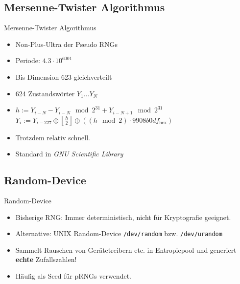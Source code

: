 \documentclass{beamer}
\begin{document}
\subsection{Mersenne-Twister Algorithmus}
\begin{frame}{Mersenne-Twister Algorithmus}
	\begin{itemize}
		\item Non-Plus-Ultra der Pseudo RNGs
		\item Periode: $4.3 \cdot  10^{6001}$
		\item Bis Dimension 623 gleichverteilt
		\item 624 Zustandswörter $Y_1 \dots Y_N$
		\item $h :=  Y_{i-N} - Y_{i-N} \mod{2^{31}} + Y_{i-N+1} \mod{2^{31}}$ \\
			$Y_i := Y_{i-227} \oplus \left\lfloor \frac{h}{2} \right\rfloor \oplus \left( \left(h \mod{2} \right) \cdot 9908b0df_{\text{hex}}\right)$
		\item Trotzdem relativ schnell.
		\item Standard in \textit{GNU Scientific Library}
	\end{itemize}
\end{frame}

\subsection{Random-Device}
\begin{frame}{Random-Device}
	\begin{itemize}
		\item Bisherige RNG: Immer deterministisch, nicht für Kryptografie geeignet.
		\item Alternative: UNIX Random-Device \texttt{/dev/random} bzw. \texttt{/dev/urandom}
		\item Sammelt Rauschen von Gerätetreibern etc. in Entropiepool und generiert \textbf{echte} Zufallszahlen!
		\item Häufig als Seed für pRNGs verwendet.
	\end{itemize}
\end{frame}
\end{document}
